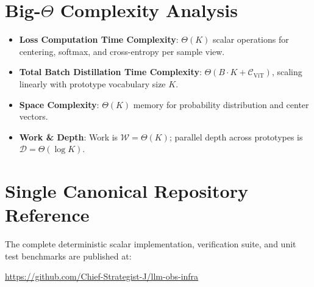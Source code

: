 \documentclass[11pt,a4paper]{article}
\theoremstyle{definition}
\begin{document}
\section{Big-$\Theta$ Complexity Analysis}

\begin{itemize}
    \item \textbf{Loss Computation Time Complexity}: $\Theta(K)$ scalar operations for centering, softmax, and cross-entropy per sample view.
    \item \textbf{Total Batch Distillation Time Complexity}: $\Theta(B \cdot K + \mathcal{C}_{\text{ViT}})$, scaling linearly with prototype vocabulary size $K$.
    \item \textbf{Space Complexity}: $\Theta(K)$ memory for probability distribution and center vectors.
    \item \textbf{Work \& Depth}: Work is $\mathcal{W} = \Theta(K)$; parallel depth across prototypes is $\mathcal{D} = \Theta(\log K)$.
\end{itemize}

\section{Single Canonical Repository Reference}

The complete deterministic scalar implementation, verification suite, and unit test benchmarks are published at:
\begin{center}
\url{https://github.com/Chief-Strategist-J/llm-obs-infra}
\end{center}
\end{document}
